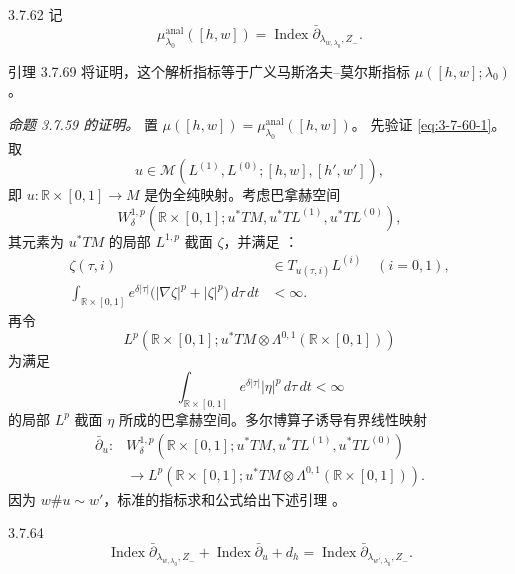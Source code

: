 \begin{definition}{3.7.62}\label{def:3-7-62}
记
\[
 \mu_{\lambda_0}^{\mathrm{anal}}([h,w])
 =
 \operatorname{Index}
 \bar\partial_{\lambda_{w,\lambda_0},Z_-}.
\]
\end{definition}

引理 3.7.69 将证明，这个解析指标等于广义马斯洛夫--莫尔斯指标
$\mu([h,w];\lambda_0)$。

\par\noindent\textit{命题 3.7.59 的证明。}\quad
置
$\mu([h,w])=\mu_{\lambda_0}^{\mathrm{anal}}([h,w])$。
先验证 \eqref{eq:3-7-60-1}。取
\[
 u\in\mathcal M(L^{(1)},L^{(0)};[h,w],[h',w']),
\]
即 $u\colon\mathbb R\times[0,1]\to M$ 是伪全纯映射。考虑巴拿赫空间
\[
 W_\delta^{1,p}
 (\mathbb R\times[0,1];u^*TM,u^*TL^{(1)},u^*TL^{(0)}),
\]
其元素为 $u^*TM$ 的局部 $L^{1,p}$ 截面 $\zeta$，并满足
：
\begin{align}
 \zeta(\tau,i)&\in T_{u(\tau,i)}L^{(i)}
 \quad(i=0,1),
\tag{3.7.63.1}\label{eq:3-7-63-1}\\
 \int_{\mathbb R\times[0,1]}e^{\delta|\tau|}
 \bigl(|\nabla\zeta|^p+|\zeta|^p\bigr)\,d\tau\,dt
 &<\infty.
\tag{3.7.63.2}\label{eq:3-7-63-2}
\end{align}
再令
\[
 L^p(\mathbb R\times[0,1];
 u^*TM\otimes\Lambda^{0,1}(\mathbb R\times[0,1]))
\]
为满足
\[
 \int_{\mathbb R\times[0,1]}e^{\delta|\tau|}|\eta|^p\,d\tau\,dt<\infty
\]
的局部 $L^p$ 截面 $\eta$ 所成的巴拿赫空间。多尔博算子诱导有界线性映射
\[
\begin{aligned}
 \bar\partial_u\colon&
 W_\delta^{1,p}
 (\mathbb R\times[0,1];u^*TM,u^*TL^{(1)},u^*TL^{(0)})\\
 &\longrightarrow
 L^p(\mathbb R\times[0,1];
 u^*TM\otimes\Lambda^{0,1}(\mathbb R\times[0,1])).
\end{aligned}
\]
因为 $w\#u\sim w'$，标准的指标求和公式给出下述引理
。

\begin{lemma}{3.7.64}\label{lem:3-7-64}
\[
 \operatorname{Index}\bar\partial_{\lambda_{w,\lambda_0},Z_-}
 +\operatorname{Index}\bar\partial_u+d_h
 =
 \operatorname{Index}\bar\partial_{\lambda_{w',\lambda_0},Z_-}.
\]
\end{lemma}

